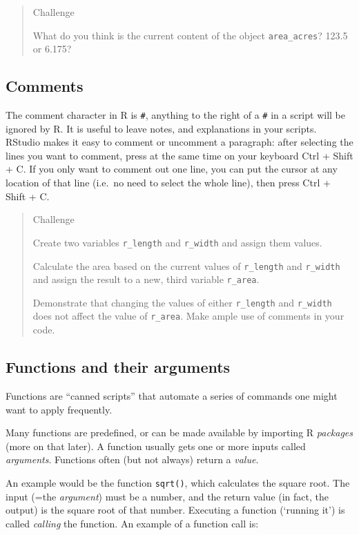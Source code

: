 \documentclass[
]{book}
\begin{document}
\begin{quote}
Challenge

What do you think is the current content of the object \texttt{area\_acres}? 123.5 or 6.175?
\end{quote}

\hypertarget{comments}{%
\subsection{Comments}\label{comments}}

The comment character in R is \texttt{\#}, anything to the right of a \texttt{\#} in a script
will be ignored by R. It is useful to leave notes, and explanations in your
scripts.
RStudio makes it easy to comment or uncomment a paragraph: after selecting the
lines you want to comment, press at the same time on your keyboard
Ctrl + Shift + C. If you only want to comment
out one line, you can put the cursor at any location of that line (i.e.~no need
to select the whole line), then press Ctrl + Shift +
C.

\begin{quote}
Challenge

Create two variables \texttt{r\_length} and \texttt{r\_width} and assign them values.

Calculate the area based on the current values of \texttt{r\_length} and \texttt{r\_width} and assign the result to a new, third variable \texttt{r\_area}.

Demonstrate that changing the values of either \texttt{r\_length} and \texttt{r\_width} does not affect the value of \texttt{r\_area}. Make ample use of comments in your code.
\end{quote}

\hypertarget{functions-and-their-arguments}{%
\subsection{Functions and their arguments}\label{functions-and-their-arguments}}

Functions are ``canned scripts'' that automate a series of commands one might want to apply frequently.

Many functions are predefined, or can be
made available by importing R \emph{packages} (more on that later). A function
usually gets one or more inputs called \emph{arguments}. Functions often (but not
always) return a \emph{value}.

An example would be the function \texttt{sqrt()}, which calculates the square root. The
input (=the \emph{argument}) must be a number, and the return value (in fact, the
output) is the square root of that number. Executing a function (`running it') is called \emph{calling} the function. An example of a function call is:
\end{document}
